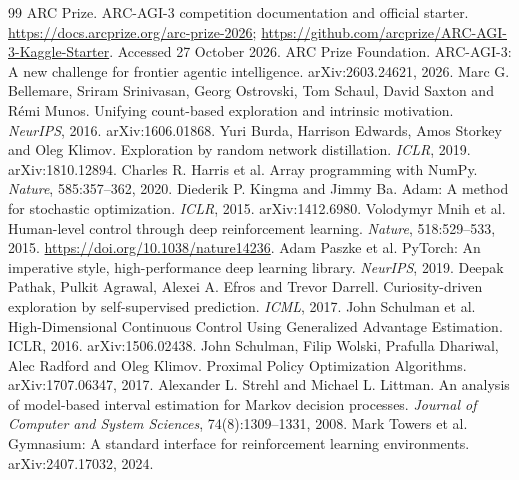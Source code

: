 \documentclass[10pt]{article}
\begin{document}
\begin{thebibliography}{99}
 ARC Prize. ARC-AGI-3 competition documentation and official starter. \url{https://docs.arcprize.org/arc-prize-2026}; \url{https://github.com/arcprize/ARC-AGI-3-Kaggle-Starter}. Accessed 27 October 2026.
 ARC Prize Foundation. ARC-AGI-3: A new challenge for frontier agentic intelligence. arXiv:2603.24621, 2026.
 Marc G. Bellemare, Sriram Srinivasan, Georg Ostrovski, Tom Schaul, David Saxton and R\'emi Munos. Unifying count-based exploration and intrinsic motivation. \emph{NeurIPS}, 2016. arXiv:1606.01868.
 Yuri Burda, Harrison Edwards, Amos Storkey and Oleg Klimov. Exploration by random network distillation. \emph{ICLR}, 2019. arXiv:1810.12894.
 Charles R. Harris et al. Array programming with NumPy. \emph{Nature}, 585:357--362, 2020.
 Diederik P. Kingma and Jimmy Ba. Adam: A method for stochastic optimization. \emph{ICLR}, 2015. arXiv:1412.6980.
 Volodymyr Mnih et al. Human-level control through deep reinforcement learning. \emph{Nature}, 518:529--533, 2015. \url{https://doi.org/10.1038/nature14236}.
 Adam Paszke et al. PyTorch: An imperative style, high-performance deep learning library. \emph{NeurIPS}, 2019.
 Deepak Pathak, Pulkit Agrawal, Alexei A. Efros and Trevor Darrell. Curiosity-driven exploration by self-supervised prediction. \emph{ICML}, 2017.
 John Schulman et al. High-Dimensional Continuous Control Using Generalized Advantage Estimation. ICLR, 2016. arXiv:1506.02438.
 John Schulman, Filip Wolski, Prafulla Dhariwal, Alec Radford and Oleg Klimov. Proximal Policy Optimization Algorithms. arXiv:1707.06347, 2017.
 Alexander L. Strehl and Michael L. Littman. An analysis of model-based interval estimation for Markov decision processes. \emph{Journal of Computer and System Sciences}, 74(8):1309--1331, 2008.
 Mark Towers et al. Gymnasium: A standard interface for reinforcement learning environments. arXiv:2407.17032, 2024.
\end{thebibliography}
\end{document}
